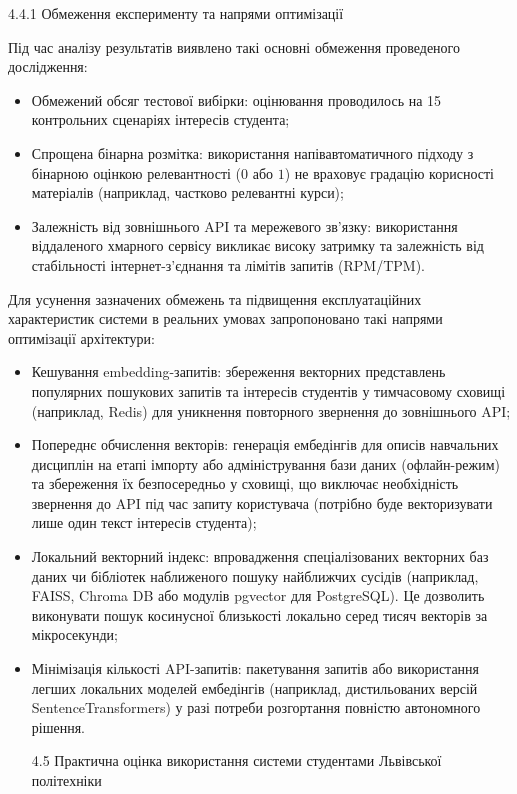\documentclass[
]{article}
\begin{document}
\begin{enumerate}
  4.4.1 Обмеження експерименту та напрями оптимізації
\end{enumerate}

Під час аналізу результатів виявлено такі основні обмеження проведеного
дослідження:

\begin{itemize}
\item
  Обмежений обсяг тестової вибірки: оцінювання проводилось на 15
  контрольних сценаріях інтересів студента;
\item
  Спрощена бінарна розмітка: використання напівавтоматичного підходу з
  бінарною оцінкою релевантності (\(0\) або \(1\)) не враховує градацію
  корисності матеріалів (наприклад, частково релевантні курси);
\item
  Залежність від зовнішнього API та мережевого зв'язку: використання
  віддаленого хмарного сервісу викликає високу затримку та залежність
  від стабільності інтернет-з'єднання та лімітів запитів (RPM/TPM).
\end{itemize}

Для усунення зазначених обмежень та підвищення експлуатаційних
характеристик системи в реальних умовах запропоновано такі напрями
оптимізації архітектури:

\begin{itemize}
\item
  Кешування embedding-запитів: збереження векторних представлень
  популярних пошукових запитів та інтересів студентів у тимчасовому
  сховищі (наприклад, Redis) для уникнення повторного звернення до
  зовнішнього API;
\item
  Попереднє обчислення векторів: генерація ембедінгів для описів
  навчальних дисциплін на етапі імпорту або адміністрування бази даних
  (офлайн-режим) та збереження їх безпосередньо у сховищі, що виключає
  необхідність звернення до API під час запиту користувача (потрібно
  буде векторизувати лише один текст інтересів студента);
\item
  Локальний векторний індекс: впровадження спеціалізованих векторних баз
  даних чи бібліотек наближеного пошуку найближчих сусідів (наприклад,
  FAISS, Chroma DB або модулів pgvector для PostgreSQL). Це дозволить
  виконувати пошук косинусної близькості локально серед тисяч векторів
  за мікросекунди;
\item
  Мінімізація кількості API-запитів: пакетування запитів або
  використання легших локальних моделей ембедінгів (наприклад,
  дистильованих версій SentenceTransformers) у разі потреби розгортання
  повністю автономного рішення.

  \protect{}\label{ux43eux431ux433ux43eux432ux43eux440ux435ux43dux43dux44f-ux442ux430-ux43fux440ux430ux43aux442ux438ux447ux43dux430-ux43eux446ux456ux43dux43aux430-ux441ux438ux441ux442ux435ux43cux438}{}4.5
  Практична оцінка використання системи студентами Львівської
  політехніки
\end{itemize}
\end{document}
